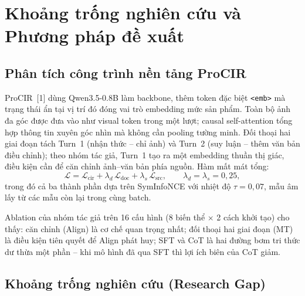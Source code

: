 \documentclass[a4paper]{article}
\newcommand{\emb}{\texttt{<emb>}}
\begin{document}
\section{Khoảng trống nghiên cứu và Phương pháp đề xuất}

\subsection{Phân tích công trình nền tảng ProCIR}
ProCIR~[1] dùng Qwen3.5-0.8B làm backbone, thêm token đặc biệt \emb{} mà trạng thái ẩn tại vị trí đó đóng vai trò embedding mức sản phẩm. Toàn bộ ảnh đa góc được đưa vào như visual token trong một lượt; causal self-attention tổng hợp thông tin xuyên góc nhìn mà không cần pooling tường minh. Đối thoại hai giai đoạn tách Turn~1 (nhận thức -- chỉ ảnh) và Turn~2 (suy luận -- thêm văn bản điều chỉnh); theo nhóm tác giả, Turn~1 tạo ra một embedding thuần thị giác, điều kiện cần để căn chỉnh ảnh--văn bản phía nguồn. Hàm mất mát tổng:
\[
\mathcal{L} = \mathcal{L}_{\text{cir}} + \lambda_d\,\mathcal{L}_{\text{doc}} + \lambda_s\,\mathcal{L}_{\text{src}}, \qquad \lambda_d=\lambda_s=0{,}25,
\]
trong đó cả ba thành phần dựa trên SymInfoNCE với nhiệt độ $\tau = 0{,}07$, mẫu âm lấy từ các mẫu còn lại trong cùng batch.

Ablation của nhóm tác giả trên 16 cấu hình (8 biến thể $\times$ 2 cách khởi tạo) cho thấy: căn chỉnh (Align) là cơ chế quan trọng nhất; đối thoại hai giai đoạn (MT) là điều kiện tiên quyết để Align phát huy; SFT và CoT là hai đường bơm tri thức dư thừa một phần -- khi mô hình đã qua SFT thì lợi ích biên của CoT giảm.

\subsection{Khoảng trống nghiên cứu (Research Gap)}\label{sec:gap}
\end{document}
